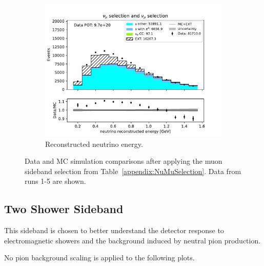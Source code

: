 \begin{figure}[H]
\begin{subfigure}{0.33\linewidth}
        \includegraphics[width=\linewidth]{technote/Sidebands/Figures/NuMuSideband/muon_sideband_neutrino_energy_run1234b4c4d_NUMU_NUMU.pdf}
        \caption{Reconstructed neutrino energy.}
    \end{subfigure}
    \caption{Data and MC simulation comparisons after applying the muon sideband selection from Table~\ref{appendix:NuMuSelection}. Data from runs 1-5 are shown.}
\end{figure}

\subsection{Two Shower Sideband}
\label{sec:TwoShowerSideband}

This sideband is chosen to better understand the detector response to electromagnetic showers and the background induced by neutral pion production.


No pion background scaling is applied to the following plots.

